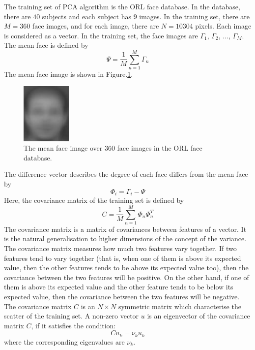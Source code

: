 The training set of PCA algorithm is the \mbox{ORL} face database. In the database, there are $40$ subjects and each subject has $9$ images. In the training set, there are $M = 360$ face images, and for each image, there are $N=10304$ pixels. Each image is considered as a vector. In the training set, the face images are $\Gamma_1$, $\Gamma_2$, $\ldots$, $\Gamma_M$. The mean face is defined by
\begin{equation}
\Psi = \frac{1}{M}\sum_{n=1}^M \Gamma_n
\end{equation}
The mean face image is shown in \mbox{Figure}.\ref{fig:meanorl}.
\begin{figure}[ht]
 \begin{center}
  \includegraphics{ch3/figures/mean.jpg}
\caption{The mean face image over $360$ face images in the \mbox{ORL} face database.}
\label{fig:meanorl}
 \end{center}
\end{figure} 
The difference vector describes the degree of each face differs from the mean face by
\begin{equation}
 \Phi_i = \Gamma_i - \Psi
\end{equation}
Here, the covariance matrix of the training set is defined by
\begin{equation}
 C=\frac{1}{M}\sum_{n=1}^M \Phi_n \Phi_n^T
\label{eq:covariancematrix}
\end{equation}
The covariance matrix is a matrix of covariances between features of a vector. It is the natural generalisation to higher dimensions of the concept of the variance. The covariance matrix measures how much two features vary together. If two features tend to vary together (that is, when one of them is above its expected value, then the other features tends to be above its expected value too), then the covariance between the two features will be positive. On the other hand, if one of them is above its expected value and the other feature tends to be below its expected value, then the covariance between the two features will be negative. The covariance matrix $C$ is an $N\times N$ symmetric matrix which characterise the scatter of the training set. A non-zero vector $u$ is an eigenvector of the covariance matrix $C$, if it satisfies the condition:
\begin{equation}
 Cu_k = \nu_k u_k
\end{equation}
where the corresponding eigenvalues are $\nu_k$.

